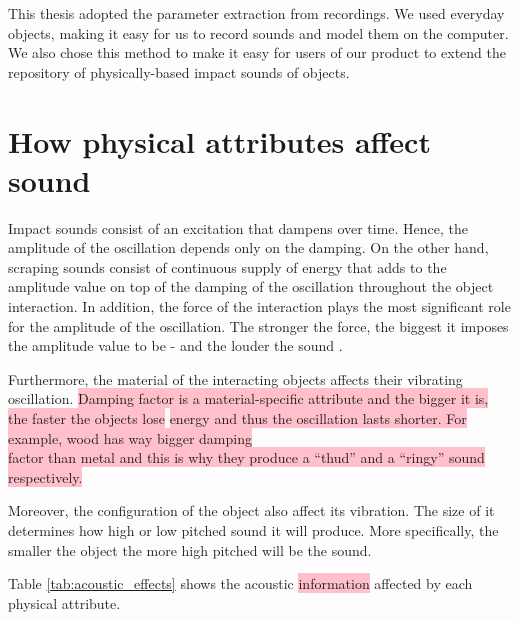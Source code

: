 This thesis adopted the parameter extraction from recordings. We used everyday objects, making it easy for us to record sounds and model them on the computer. We also chose this method to make it easy for users of our product to extend the repository of physically-based impact sounds of objects.

\section{How physical attributes affect sound}
\colorbox{pink}{}

Impact sounds consist of an excitation that dampens over time. Hence, the amplitude of the oscillation depends only on the damping. On the other hand, scraping sounds consist of continuous supply of energy that adds to the amplitude value on top of the damping of the oscillation throughout the object interaction. In addition, the force of the interaction plays the most significant role for the amplitude of the oscillation. The stronger the force, the biggest it imposes the amplitude value to be - and the louder the sound \cite{gaver1993world}.

Furthermore, the material of the interacting objects affects their vibrating oscillation. \colorbox{pink}{Damping factor is a material-specific attribute and the bigger it is, the faster the objects lose} \colorbox{pink}{energy and thus the oscillation lasts shorter. For example, wood has way bigger damping}\\ \colorbox{pink}{factor than metal and this is why they produce a ``thud'' and a ``ringy'' sound respectively. }

Moreover, the configuration of the object also affect its vibration. The size of it determines how high or low pitched sound it will produce. More specifically, the smaller the object the more high pitched will be the sound.  

Table \ref{tab:acoustic_effects} shows the acoustic \colorbox{pink}{information} affected by each physical attribute. 

